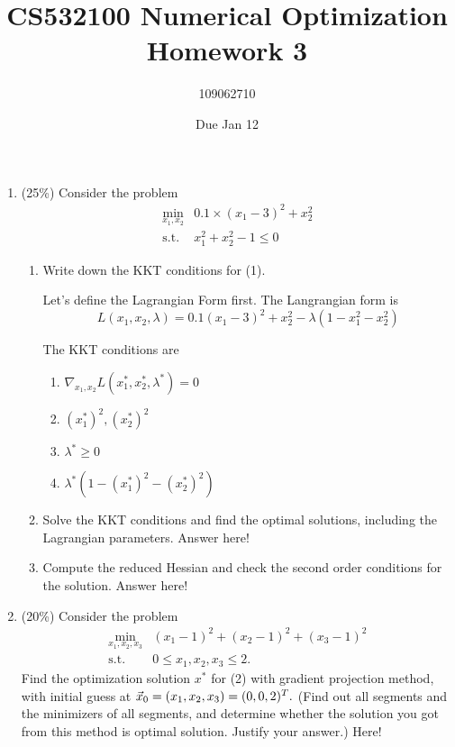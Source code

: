 \documentclass[a4paper,10pt]{article}
\title{CS532100 Numerical Optimization Homework 3}
\author{109062710}
\date{Due Jan 12}
\begin{document}
\maketitle
\begin{enumerate}
    \item (25\%)
    Consider the problem
    \begin{equation}\label{(1)}
        \begin{array}{cc}
            \displaystyle\min_{x_1,x_2} & 0.1\times(x_1-3)^2+x_2^2 \\
            \mbox{s.t.} & x_1^2+x_2^2 -1 \le 0
        \end{array}
    \end{equation}
    
    \begin{enumerate}
        \item Write down the KKT conditions for (1).

        {\color{blue}
            Let's define the Lagrangian Form first. The Langrangian form is
            \[
                L(x_1, x_2, \lambda) = 0.1(x_1 - 3)^2 + x_2^2 - \lambda (1 - x_1^2 - x_2^2)
            \]

            The KKT conditions are
            \begin{enumerate}
                \item $\nabla_{x_1, x_2} L(x_1^*, x_2^*, \lambda^*) = 0$
                \item $(x_1^*)^2, (x_2^*)^2$
                \item $\lambda^* \geq 0 $
                \item $\lambda^*(1 - (x_1^*)^2 - (x_2^*)^2)$
            \end{enumerate}
        }

        \item Solve the KKT conditions and find the optimal solutions, including the Lagrangian parameters.
        {\color{blue}
            Answer here!
        }

        \item Compute the reduced Hessian and check the second order conditions for the solution.
        {\color{blue}
            Answer here!
        }
    \end{enumerate}


    \item (20\%) Consider the problem 
    \begin{equation}\label{(2)}
        \begin{array}{cc}
            \displaystyle\min_{x_1,x_2, x_3} & (x_1-1)^2+(x_2 - 1)^2 + (x_3 - 1)^2 \\
            \mbox{s.t.} & 0\le x_1, x_2, x_3\le 2.
        \end{array}
    \end{equation}
    Find the optimization solution $x^{\ast}$ for (2) with gradient projection method, with initial guess at $\vec{x}_0 =  (x_1, x_2, x_3) = (0, 0, 2)^T.\\$
    (Find out all segments and the minimizers of all segments, and determine whether the solution you got from this method is optimal solution. Justify your answer.)
    {\color{blue}
        Here!
    }



\end{enumerate}
\end{document}
